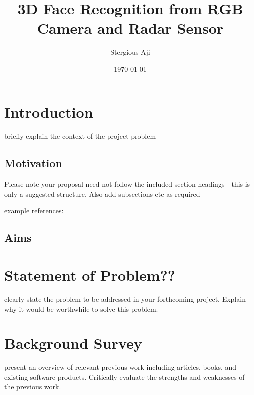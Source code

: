\documentclass{interim}
\begin{document}
\title{3D Face Recognition from RGB Camera and Radar Sensor}
\author{Stergious Aji}
\date{\today}
\maketitle

\tableofcontents
\newpage

\section{Introduction}\label{intro}

briefly explain the context of the project problem

\subsection{Motivation}
Please note your proposal need not follow the included section headings - this is only a suggested structure. Also add subsections etc as required

example references: \cite{BK08}

\subsection{Aims}

\section{Statement of Problem??}

clearly state the problem to be addressed in your forthcoming project. Explain why it would be worthwhile to solve this problem.

\section{Background Survey}

present an overview of relevant previous work including articles, books, and existing software products. Critically evaluate the strengths and weaknesses of the previous work.
\end{document}
